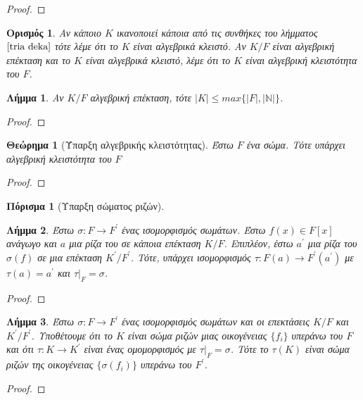 \documentclass[oneside,a4paper]{article}
\newtheorem{theorem}{Θεώρημα}
\newtheorem{lemma}{Λήμμα}
\newtheorem*{defn}{Ορισμός}
\newtheorem{cor}{Πόρισμα}
\begin{document}
\begin{proof}
\end{proof}

\begin{defn} Αν κάποιο $K$ ικανοποιεί κάποια από τις συνθήκες του λήμματος $\ref{tria deka}$ τότε λέμε ότι το $K$ είναι αλγεβρικά κλειστό. Αν $K/F$ είναι αλγεβρική επέκταση και το $K$ είναι αλγεβρικά κλειστό, λέμε ότι το $K$ είναι αλγεβρική κλειστότητα του $F$.
\end{defn}

\begin{lemma}
	Αν $K/F$ αλγεβρική επέκταση, τότε $|K| \leq max\{|F| , |\mathbb N|\}$.
\end{lemma}
\begin{proof}
\end{proof}


\begin{theorem}[Ύπαρξη αλγεβρικής κλειστότητας]
	Έστω $F$ ένα σώμα. Τότε υπάρχει αλγεβρική κλειστότητα του $F$
\end{theorem}
\begin{proof}
\end{proof}


\begin{cor}[Υπαρξη σώματος ριζών]
\end{cor}


\begin{lemma} Έστω $\sigma : F \rightarrow F^{\prime}$ ένας ισομορφισμός σωμάτων. Έστω $f(x) \in F[x]$ ανάγωγο και $a$ μια ρίζα του σε κάποια επέκταση $K/F$. Επιπλέον, έστω $a^{\prime}$ μια ρίζα του $\sigma(f)$ σε μια επέκταση $K^{\prime} / F^{\prime}$. Τότε, υπάρχει ισομορφισμός $\tau : F(a) \rightarrow F^{\prime} ( a ^{\prime})$ με $\tau (a) = a^{\prime}$ και $\tau|_F = \sigma$.
\end{lemma}

\begin{proof}%
\end{proof}

\begin{lemma} Έστω $\sigma : F \rightarrow F^{\prime}$ ένας ισομορφισμός σωμάτων και οι επεκτάσεις $K/F$ και $K^{\prime} / F^{\prime}$. Υποθέτουμε ότι το $K$ είναι σώμα ριζών μιας οικογένειας $\{f_i\}$ υπεράνω του $F$ και ότι $\tau : K \rightarrow K^{\prime}$ είναι ένας ομομορφισμός με $\tau|_F = \sigma$. Τότε το $\tau(K)$ είναι σώμα ριζών της οικογένειας $\{\sigma(f_i) \}$ υπεράνω του $F^{\prime}$.
\end{lemma}

\begin{proof}
\end{proof}
\end{document}
